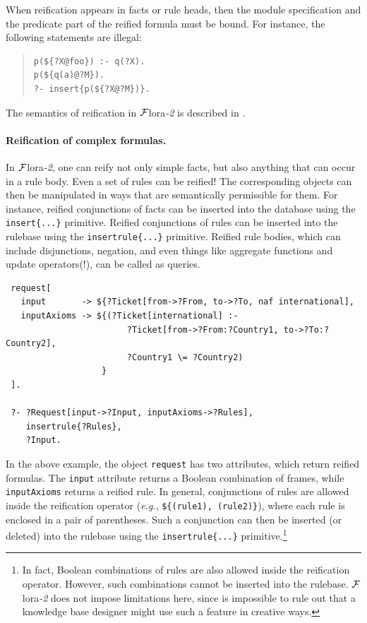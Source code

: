 \documentclass[11pt]{article}
\newcommand{\FLORA}{{\mbox{\sc ${\cal F}${lora}\rm\emph{-2}}}\xspace}
\begin{document}
When reification appears in facts or rule heads, then the module
specification and the predicate part of the reified formula must be bound.
For instance, the following statements are illegal:
\begin{quote}
\begin{verbatim}
p(${?X@foo}) :- q(?X).
p(${q(a)@?M}).
?- insert{p(${?X@?M})}. 
\end{verbatim}
\end{quote}

\noindent
The semantics of reification in \FLORA is described in
\cite{reification-data-semantics-03}.

\paragraph{Reification of complex formulas.}
In \FLORA, one can reify not only simple facts, but also anything that
can occur in a rule body. Even a set of rules can be reified!
The corresponding objects can then be manipulated in ways that are semantically
permissible for them. For instance, reified conjunctions of facts can be
inserted into the database using the \verb|insert{...}| primitive. 
Reified conjunctions of rules can be inserted into the rulebase using the
\verb|insertrule{...}| primitive. Reified rule bodies, which can include
disjunctions, negation, and even things like aggregate functions and update
operators(!), can be called as queries.
\begin{verbatim}
 request[
   input       -> ${?Ticket[from->?From, to->?To, naf international],
   inputAxioms -> ${(?Ticket[international] :-
                        ?Ticket[from->?From:?Country1, to->?To:?Country2],
                        ?Country1 \= ?Country2)
                   }
 ].

 ?- ?Request[input->?Input, inputAxioms->?Rules],
    insertrule{?Rules},
    ?Input.
\end{verbatim}

In the above example, the object {\tt request} has two attributes, which
return reified formulas. The {\tt input} attribute returns a Boolean
combination of frames, while {\tt inputAxioms} returns a reified rule.
In general, conjunctions of rules are allowed inside the reification
operator ({\it e.g.}, \verb|${(rule1), (rule2)}|), where each rule is
enclosed in a pair of parentheses. Such a conjunction can then be inserted
(or deleted) into the rulebase using the {\tt insertrule\{...\}}
primitive.\footnote{
  In fact, Boolean combinations of rules are also allowed inside the
  reification operator. However, such combinations cannot be inserted into
  the rulebase. \FLORA does not impose limitations here, since is
  impossible to rule out that a knowledge base designer might use such a
  feature in creative ways.
}
\end{document}
